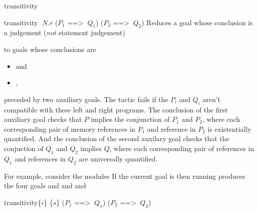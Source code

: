 \begin{tactic}{transitivity}
  \begin{tsyntax}{transitivity $\;N$.$r$ ($P_1$ ==> $\ Q_1$) ($P_2$ ==> $\ Q_2$)}
    Reduces a goal whose conclusion is a \prhl judgement
    (\emph{not} statement judgement)
    \begin{center}
    \end{center}
    to goals whose conclusions are
    \begin{itemize}
    \item {} and
    \item {},
    \end{itemize}
    preceded by two auxiliary goals. The tactic fails if the $P_i$ and
    $Q_i$ aren't compatible with these left and right programs.  The
    conclusion of the first auxiliary goal checks that $P$ implies the
    conjunction of $P_1$ and $P_2$, where each corresponding pair of
     memory references in $P_1$ and  reference in $P_2$
    is existentially quantified.  And the conclusion of the second
    auxilary goal checks that the conjuction of $Q_1$ and $Q_2$ implies
    $Q$, where each corresponding pair of  references in $Q_1$
    and  references in $Q_2$ are universally quantified.

  \medskip For example, consider the modules
  If the current goal is
   then
  running 
  produces the four goals
  and
  and
  and
  \end{tsyntax}

  \begin{tsyntax}{transitivity\{$i$\} \{$s$\} ($P_1$ ==> $\ Q_1$) ($P_2$ ==> $\ Q_2$)}
    

\end{tsyntax}
\end{tactic}
